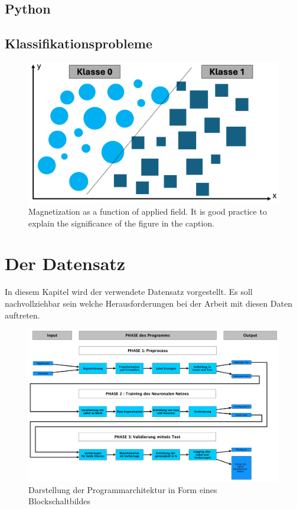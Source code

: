 \documentclass[journal,twoside,web]{ieeecolor}
\begin{document}
\subsection{Python}


\subsection{Klassifikationsprobleme}


\begin{figure}[!t]
    \centerline{\includegraphics[width=\columnwidth]{Andi/binaere_klassifikation.png}}
    \caption{Magnetization as a function of applied field.
    It is good practice to explain the significance of the figure in the caption.}
    \label{fig:binaere_klassifikation}
\end{figure}



\section{Der Datensatz}
In diesem Kapitel wird der verwendete Datensatz vorgestellt. Es soll nachvollziehbar sein welche Herausforderungen bei der Arbeit mit diesen Daten auftreten. 


\begin{figure}[!t]
\centerline{\includegraphics[width=\columnwidth]{Architektur.png}}
\caption{Darstellung der Programmarchitektur in Form eines Blockschaltbildes}
\label{fig:architecture}
\end{figure}
\end{document}
